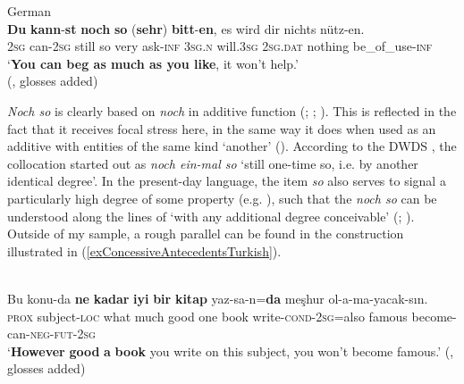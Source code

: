 \begin{exe}
	\ex German\label{exConcessiveAntecedentsNochSo1}\\
	\gll \textbf{Du} \textbf{kann}-\textbf{st} \textbf{noch} \textbf{so} \textup{(}\textbf{sehr}\textup{)} \textbf{bitt}-\textbf{en}, es wird dir nichts nütz-en.\\
	2\textsc{sg} can-2\textsc{sg} still so \phantom{(}very ask-\textsc{inf} 3\textsc{sg}.\textsc{n} will.3\textsc{sg} 2\textsc{sg}.\textsc{dat} nothing be\_of\_use-\textsc{inf}\\
	\glt \lq \textbf{You can beg as much as you like}, it won't help.'
	\\(\cite[s.v. \textit{noch}]{Duden}, glosses added)
\end{exe}

\textit{Noch so} is clearly based on \textit{noch} in additive function (\cite{HaspelmathKoenig1998}; \cite[634]{MetrichFaucher2009}; \cite{Shetter1966}). This is reflected in the fact that it receives focal stress here, in the same way it does when used as an additive with entities of the same kind \lq another\rq{ }(). According to the DWDS \parencite[s.v. \textit{noch}]{DWDS}, the collocation started out as \textit{noch ein-mal so} \lq still one-time so, i.e. by another identical degree\rq{}. In the present-day language, the item \textit{so} also serves to signal a particularly high degree of some property (e.g. \cite[s.v. \textit{so}]{DWDS}), such that the \textit{noch so} can be understood along the lines of  \lq with any additional degree conceivable\rq{ }(\cite[634]{MetrichFaucher2009}; \cite{Shetter1966}). Outside of my sample, a rough parallel can be found in the  construction illustrated in (\ref{exConcessiveAntecedentsTurkish}).

\begin{exe}
	\ex {}\label{exConcessiveAntecedentsTurkish}\\
	\gll Bu konu-da \textbf{ne} \textbf{kadar} \textbf{iyi} \textbf{bir} \textbf{kitap} yaz-sa-n=\textbf{da} meşhur ol-a-ma-yacak-sın.\\
	\textsc{prox} subject-\textsc{loc} what much good one book write-\textsc{cond}-2\textsc{sg}=also famous become-can-\textsc{neg}-\textsc{fut}-2\textsc{sg}\\
	\glt \lq \textbf{However} \textbf{good} \textbf{a} \textbf{book} you write on this subject, you won't become famous.\rq{ }(\cite[435]{GoekselKerslake2005}, glosses added)
\end{exe}

